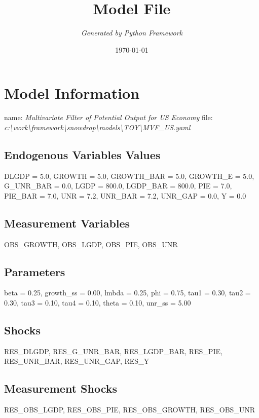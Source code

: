 \documentclass{article}%
\title{\textbf{Model File}}%
\author{\textit{Generated by Python Framework}}%
\date{\today}%
\begin{document}
%
\normalsize%
\maketitle%
\section{Model Information}%
\label{sec:ModelInformation}%
name: %
\textit{Multivariate Filter of Potential Output for US Economy}%
\newline%
file: %
\textit{c:\textbackslash{}work\textbackslash{}framework\textbackslash{}snowdrop\textbackslash{}models\textbackslash{}TOY\textbackslash{}MVF\_US.yaml}%
\subsection{Endogenous Variables Values}%
\label{subsec:EndogenousVariablesValues}%
DLGDP = 5.0, GROWTH = 5.0, GROWTH\_BAR = 5.0, GROWTH\_E = 5.0, G\_UNR\_BAR = 0.0, LGDP = 800.0, LGDP\_BAR = 800.0, PIE = 7.0, PIE\_BAR = 7.0, UNR = 7.2, UNR\_BAR = 7.2, UNR\_GAP = 0.0, Y = 0.0

%
\subsection{Measurement Variables}%
\label{subsec:MeasurementVariables}%
OBS\_GROWTH, OBS\_LGDP, OBS\_PIE, OBS\_UNR

%
\subsection{Parameters}%
\label{subsec:Parameters}%
beta = 0.25, growth\_ss = 0.00, lmbda = 0.25, phi = 0.75, tau1 = 0.30, tau2 = 0.30, tau3 = 0.10, tau4 = 0.10, theta = 0.10, unr\_ss = 5.00

%
\subsection{Shocks}%
\label{subsec:Shocks}%
RES\_DLGDP, RES\_G\_UNR\_BAR, RES\_LGDP\_BAR, RES\_PIE, RES\_UNR\_BAR, RES\_UNR\_GAP, RES\_Y

%
\subsection{Measurement Shocks}%
\label{subsec:MeasurementShocks}%
RES\_OBS\_LGDP, RES\_OBS\_PIE, RES\_OBS\_GROWTH, RES\_OBS\_UNR

%
\end{document}
